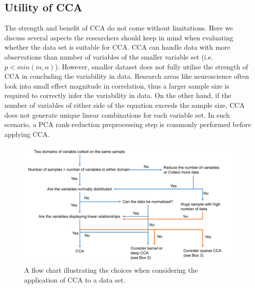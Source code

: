 \subsection{Utility of CCA}
\label{ch:methods:limitations}
The strength and benefit of CCA do not come without limitations. Here we discuss several aspects the researchers should keep in mind when evaluating whether the data set is suitable for CCA. CCA can handle data with more observations than number of variables of the smaller variable set (i.e. $p < min(m, n)$). However, smaller dataset does not fully utilise the strength of CCA in concluding the variability in data. Research areas like neuroscience often look into small effect magnitude in correlation, thus a larger sample size is required to correctly infer the variability in data. On the other hand, if the number of variables of either side of the equation exceeds the sample size, CCA does not generate unique linear combinations for each variable set. In such scenario, a PCA rank-reduction preprocessing step is commonly performed before applying CCA.

\begin{figure}[H]
	\centering
	\includegraphics[width=1\textwidth]{cca/image/ccafig4.png}
	\caption{A flow chart illustrating the choices when considering the application of CCA to a data set.}
	\label{fig:methods:fig4}
\end{figure}

